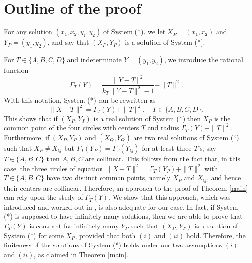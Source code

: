 \documentclass[10pt]{amsart}
\theoremstyle{definition}
\theoremstyle{remark}
\begin{document}



\section{Outline of the proof} For any solution $(x_1,x_2,y_1,y_2)$ of System (*), we let $X_P=(x_1,x_2)$ and $Y_P=(y_1,y_2)$, and say that $(X_P,Y_P)$ is a solution of System (*).

For $T\in \{A,B,C,D\}$ and indeterminate $Y=(y_1,y_2)$, %
we introduce the rational function
\begin{equation}
\label{eq241} \Gamma_T(Y)=\frac{\|Y-T\|^2}{k_T\|Y-T\|^2-1}-\|T\|^2.
\end{equation}
With this notation,  System (*) can be rewritten as
\begin{equation}
\label{eq242} \|X-T\|^2=\Gamma_T(Y)+\|T\|^2, \quad T\in\{A,B,C,D\}.
\end{equation}
This shows that if $(X_P,Y_P)$ is a real solution of System (*) then $X_P$ is the common point of the four circles with centers $T$ and radius $\Gamma_T(Y)+\|T\|^2$. Furthermore, if $(X_P,Y_P)$ and
$(X_Q,Y_Q)$ are two real solutions of System (*) such that $X_P\neq X_Q$ but $\Gamma_T(Y_P)=\Gamma_T(Y_Q)$ for at least three $T$'s, say $T\in \{A,B,C\}$ then $A,B,C$ are collinear. This follows from the fact that, in this case, the three circles of equation $\|X-T\|^2=\Gamma_T(Y_P)+\|T\|^2$  with $T\in\{A,B,C\}$ have two distinct common points, namely $X_P$ and $X_Q$, and hence their centers are collinear. Therefore, an approach to the proof of Theorem \ref{main} can rely upon the study of $\Gamma_T(Y)$. We show that this approach, which was introduced and worked out in \cite{ak2024}, is also adequate for our case. In fact, if System (*) is supposed to have infinitely many solutions, then we are able to prove that $\Gamma_T(Y)$ is constant for infinitely many $Y_P$ such that $(X_P,Y_P)$ is a solution of System (*) for some $X_P$, provided that both $(i)$ and $(ii)$ hold. Therefore, the finiteness of the solutions of System (*) holds under our two assumptions $(i)$ and $(ii)$, as claimed in Theorem \ref{main}.
\end{document}
